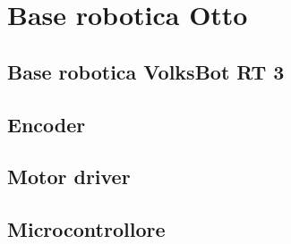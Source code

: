 \chapter{Base robotica Otto}

\section{Base robotica VolksBot RT 3}
\section{Encoder}
\section{Motor driver}
\section{Microcontrollore}